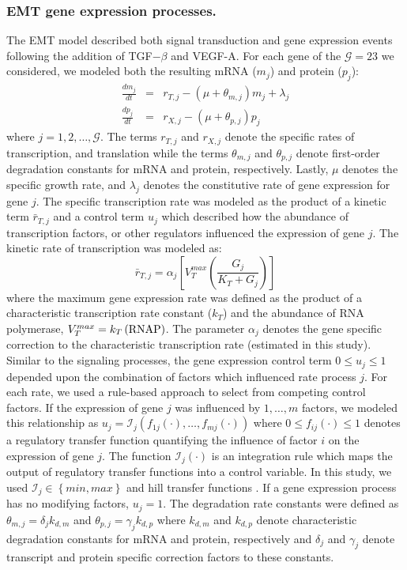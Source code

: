 \documentclass[11pt,letterpaper]{article}
\begin{document}
\subsubsection*{EMT gene expression processes.}
The EMT model described both signal transduction and gene expression events following the addition of TGF$-\beta$ and VEGF-A.
For each gene of the $\mathcal{G}=23$ we considered, we modeled both the resulting mRNA ($m_{j}$) and protein ($p_{j}$):
\begin{eqnarray}
	\frac{dm_{j}}{dt} &=& r_{T,j} - \left(\mu+\theta_{m,j}\right)m_{j}+\lambda_{j}\\
	\frac{dp_{j}}{dt} &=& r_{X,j} - \left(\mu+\theta_{p,j}\right)p_{j}
\end{eqnarray}where $j=1,2,\dots,\mathcal{G}$.
The terms $r_{T,j}$ and $r_{X,j}$ denote the specific rates of transcription, and translation while
the terms $\theta_{m,j}$ and $\theta_{p,j}$ denote first-order degradation constants for mRNA and protein, respectively.
Lastly, $\mu$ denotes the specific growth rate, and $\lambda_{j}$ denotes the constitutive rate of gene expression for gene $j$.
The specific transcription rate was modeled as the product of a kinetic term $\bar{r}_{T,j}$ and a control term $u_{j}$ which described how the
abundance of transcription factors, or other regulators influenced the expression of gene $j$.
The kinetic rate of transcription was modeled as:
\begin{equation}
	\bar{r}_{T,j} = \alpha_{j}\left[V^{max}_{T}\left(\frac{G_{j}}{K_{T}+G_{j}}\right)\right]
\end{equation}where the maximum gene expression rate was defined as the product of a characteristic transcription rate constant ($k_{T}$)
and the abundance of RNA polymerase, $V^{max}_{T} = k_{T}\left(\rm RNAP\right)$.
The parameter $\alpha_{j}$ denotes the gene specific correction to the characteristic transcription rate (estimated in this study).
Similar to the signaling processes, the gene expression control term $0\leq u_{j}\leq 1$ depended upon the combination of factors which influenced rate process $j$.
For each rate, we used a rule-based approach to select from competing control factors.
If the expression of gene $j$ was influenced by $1,\dots,m$ factors, we modeled this relationship as
$u_{j}=\mathcal{I}_{j}\left(f_{1j}\left(\cdot\right),\hdots,f_{mj}\left(\cdot\right)\right)$
where $0\leq f_{ij}\left(\cdot\right)\leq 1$ denotes a regulatory transfer function quantifying the influence of factor $i$ on the expression of gene $j$.
The function $\mathcal{I}_{j}\left(\cdot\right)$ is an integration rule which maps the output of regulatory transfer functions into a control
variable. In this study, we used $\mathcal{I}_{j}\in\left\{min,max\right\}$ and hill transfer functions \cite{pr3010178,pr3010138}.
If a gene expression process has no modifying factors, $u_{j}=1$.
The degradation rate constants were defined as $\theta_{m,j} = \delta_{j}k_{d,m}$ and $\theta_{p,j} = \gamma_{j}k_{d,p}$
where $k_{d,m}$ and $k_{d,p}$ denote characteristic degradation constants for mRNA and protein, respectively and $\delta_{j}$ and $\gamma_{j}$ denote transcript and protein specific
correction factors to these constants.
\end{document}
